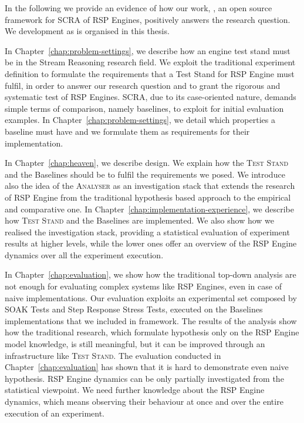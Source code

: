 \noindent In the following we provide an evidence of how our work, \name, an open source framework for SCRA of RSP Engines, positively answers the research question. We development as is organised in this thesis.

In Chapter~\ref{chap:problem-settings}, we describe how an engine test stand must be in the Stream Reasoning research field. We exploit the traditional experiment definition to formulate the requirements that a Test Stand for RSP Engine must fulfil, in order to answer our research question and to grant the rigorous and systematic test of RSP Engines. SCRA, due to its case-oriented nature, demands simple terms of comparison, namely baselines, to exploit for initial evaluation examples. In Chapter~\ref{chap:problem-settings}, we detail which properties a baseline must have and we formulate them as requirements for their implementation.


In Chapter~\ref{chap:heaven}, we describe \name design. We explain how the \textsc{Test Stand} and the Baselines should be to fulfil the requirements we posed. We introduce also the idea of the \textsc{Analyser} as an investigation stack that extends the research of RSP Engine from the traditional hypothesis based approach to the empirical and comparative one. In Chapter~\ref{chap:implementation-experience}, we describe how \name \textsc{Test Stand} and the Baselines are implemented. We also show how we realised the investigation stack, providing a statistical evaluation of experiment results at higher levels, while the lower ones offer an overview of the RSP Engine dynamics over all the experiment execution.

In Chapter~\ref{chap:evaluation}, we show how the traditional top-down analysis are not enough for evaluating complex systems like RSP Engines, even in case of naive implementations. Our evaluation exploits an experimental set composed by SOAK Tests and Step Response Stress Tests, executed on the Baselines implementations that we included in \name framework. The results of the analysis show how the traditional research, which formulate hypothesis only on the RSP Engine model knowledge, is still meaningful, but it can be improved through an infrastructure like \name \textsc{Test Stand}. The evaluation conducted in Chapter~\ref{chap:evaluation} has shown that it is hard to demonstrate even naive hypothesis. RSP Engine dynamics can be only partially investigated from the statistical viewpoint. We need further knowledge about the RSP Engine dynamics, which means observing their behaviour at once and over the entire execution of an experiment. %


